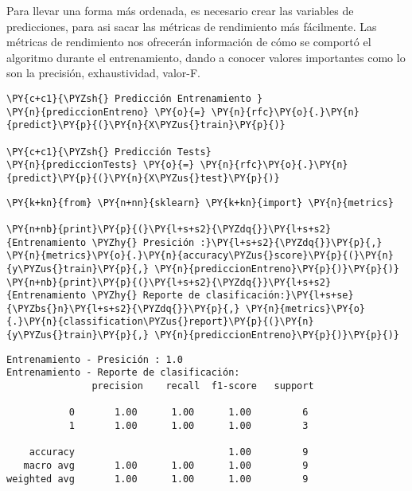 Para llevar una forma más ordenada, es necesario crear las variables de
predicciones, para asi sacar las métricas de rendimiento más fácilmente.
Las métricas de rendimiento nos ofrecerán información de cómo se
comportó el algoritmo durante el entrenamiento, dando a conocer valores
importantes como lo son la precisión, exhaustividad, valor-F.

    \begin{tcolorbox}[breakable, size=fbox, boxrule=1pt, pad at break*=1mm,colback=cellbackground, colframe=cellborder]
\begin{Verbatim}[commandchars=\\\{\}]
\PY{c+c1}{\PYZsh{} Predicción Entrenamiento }
\PY{n}{prediccionEntreno} \PY{o}{=} \PY{n}{rfc}\PY{o}{.}\PY{n}{predict}\PY{p}{(}\PY{n}{X\PYZus{}train}\PY{p}{)}

\PY{c+c1}{\PYZsh{} Predicción Tests}
\PY{n}{prediccionTests} \PY{o}{=} \PY{n}{rfc}\PY{o}{.}\PY{n}{predict}\PY{p}{(}\PY{n}{X\PYZus{}test}\PY{p}{)}
\end{Verbatim}
\end{tcolorbox}

    \begin{tcolorbox}[breakable, size=fbox, boxrule=1pt, pad at break*=1mm,colback=cellbackground, colframe=cellborder]
\begin{Verbatim}[commandchars=\\\{\}]
\PY{k+kn}{from} \PY{n+nn}{sklearn} \PY{k+kn}{import} \PY{n}{metrics}

\PY{n+nb}{print}\PY{p}{(}\PY{l+s+s2}{\PYZdq{}}\PY{l+s+s2}{Entrenamiento \PYZhy{} Presición :}\PY{l+s+s2}{\PYZdq{}}\PY{p}{,} \PY{n}{metrics}\PY{o}{.}\PY{n}{accuracy\PYZus{}score}\PY{p}{(}\PY{n}{y\PYZus{}train}\PY{p}{,} \PY{n}{prediccionEntreno}\PY{p}{)}\PY{p}{)}
\PY{n+nb}{print}\PY{p}{(}\PY{l+s+s2}{\PYZdq{}}\PY{l+s+s2}{Entrenamiento \PYZhy{} Reporte de clasificación:}\PY{l+s+se}{\PYZbs{}n}\PY{l+s+s2}{\PYZdq{}}\PY{p}{,} \PY{n}{metrics}\PY{o}{.}\PY{n}{classification\PYZus{}report}\PY{p}{(}\PY{n}{y\PYZus{}train}\PY{p}{,} \PY{n}{prediccionEntreno}\PY{p}{)}\PY{p}{)}
\end{Verbatim}
\end{tcolorbox}

    \begin{Verbatim}[commandchars=\\\{\}]
Entrenamiento - Presición : 1.0
Entrenamiento - Reporte de clasificación:
               precision    recall  f1-score   support

           0       1.00      1.00      1.00         6
           1       1.00      1.00      1.00         3

    accuracy                           1.00         9
   macro avg       1.00      1.00      1.00         9
weighted avg       1.00      1.00      1.00         9

    \end{Verbatim}

